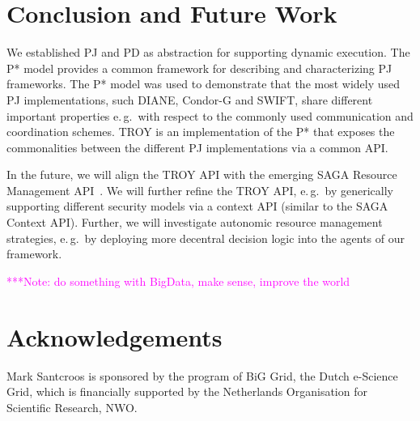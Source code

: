 \documentclass[conference,final]{IEEEtran}
\newcommand{\note}[1]{ {\textcolor{magenta} { ***Note: #1 }}}
\newcommand{\note}[1]{}
\begin{document}
\section{Conclusion and Future Work}

We established PJ and PD as abstraction for supporting dynamic execution. The P*
model provides a common framework for describing and characterizing PJ
frameworks. The P* model was used to demonstrate that the most widely used PJ
implementations, such DIANE, Condor-G and SWIFT, share different important
properties e.\,g.\ with respect to the commonly used communication and
coordination schemes. TROY is an implementation of the P* that exposes the
commonalities between the different PJ implementations via a common API.

In the future, we will align the TROY API with the emerging SAGA Resource
Management API~\cite{saga_rm}. We will further refine the TROY API, e.\,g.\ by
generically supporting different security models via a context API (similar to
the SAGA Context API). Further, we will investigate autonomic resource
management strategies, e.\,g.\ by deploying more decentral decision logic into
the agents of our framework.



\note{do something with BigData, make sense, improve the world}

\section*{Acknowledgements}
Mark Santcroos is sponsored by the program of BiG Grid, the Dutch e-Science Grid, which is financially supported by the Netherlands Organisation for Scientific Research, NWO.




\end{document}
